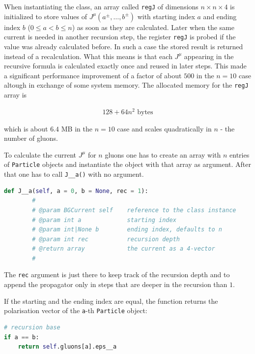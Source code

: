\documentclass{article}
\theoremstyle{definition}
\def\code#1{\texttt{#1}}
\numberwithin{equation}{section}
\begin{document}
When instantiating the class, an array called \code{regJ} of dimensions $n \times n \times 4$ is initialized to store values of $J^{\mu}(a^{\pm}, \dots, b^{\pm})$ with starting index $a$ and ending index $b$ ($0 \leq a < b \leq n$) as soon as they are calculated. Later when the same current is needed in another recursion step, the register \code{regJ} is probed if the value was already calculated before. In such a case the stored result is returned instead of a recalculation. What this means is that each $J^{\mu}$ appearing in the recursive formula is calculated exactly once and reused in later steps. This made a significant performance improvement of a factor of about $500$ in the $n=10$ case altough in exchange of some system memory. The allocated memory for the \code{regJ} array is \cite{mem}

\begin{align*}
    128 + 64 n^2 \text{ bytes}
\end{align*}

which is about $6.4$ MB in the $n=10$ case and scales quadratically in $n$ - the number of gluons.

To calculate the current $J^{\mu}$ for $n$ gluons one has to create an array with $n$ entries of \code{Particle} objects and instantiate the object with that array as argument. After that one has to call \code{J\_\_a()} with no argument.

\begin{lstlisting}[language=Python, caption=Recursion step method]
    def J__a(self, a = 0, b = None, rec = 1):
        #
        # @param BGCurrent self    reference to the class instance
        # @param int a             starting index
        # @param int|None b        ending index, defaults to n
        # @param int rec           recursion depth
        # @return array            the current as a 4-vector
        #
\end{lstlisting}

The \code{rec} argument is just there to keep track of the recursion depth and to append the propagator only in steps that are deeper in the recursion than $1$.

If the starting and the ending index are equal, the function returns the polarisation vector of the \code{a}-th \code{Particle} object:

\begin{lstlisting}[language=Python]
# recursion base
if a == b:
    return self.gluons[a].eps__a
\end{lstlisting}
\end{document}
